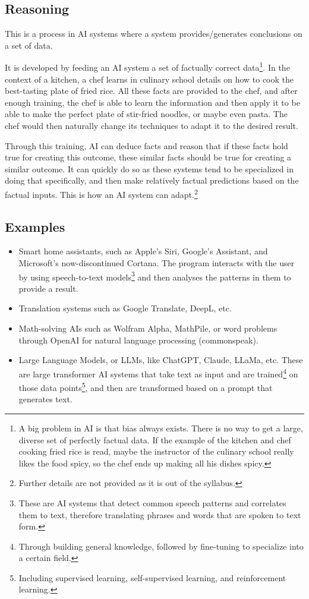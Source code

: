 \documentclass[../main.tex]{subfiles}
\begin{document}
\subsection{Reasoning}

This is a process in AI systems where a system provides/generates conclusions on a set of data.

It is developed by feeding an AI system a set of factually correct data\footnote{A big problem in AI is that bias always exists. There is no way to get a large, diverse set of perfectly factual data. If the example of the kitchen and chef cooking fried rice is read, maybe the instructor of the culinary school really likes the food spicy, so the chef ends up making all his dishes spicy.}. In the context of a kitchen, a chef learns in culinary school details on how to cook the best-tasting plate of fried rice. All these facts are provided to the chef, and after enough training, the chef is able to learn the information and then apply it to be able to make the perfect plate of stir-fried noodles, or maybe even pasta. The chef would then naturally change its techniques to adapt it to the desired result.

Through this training, AI can deduce facts and reason that if these facts hold true for creating this outcome, these similar facts should be true for creating a similar outcome. It can quickly do so as these systems tend to be specialized in doing that specifically, and then make relatively factual predictions based on the factual inputs. This is how an AI system can adapt.\footnote{Further details are not provided as it is out of the syllabus.}

\subsection{Examples}

\begin{itemize}
    \item Smart home assistants, such as Apple’s Siri, Google’s Assistant, and Microsoft’s now-discontinued Cortana. The program interacts with the user by using speech-to-text models\footnote{These are AI systems that detect common speech patterns and correlates them to text, therefore translating phrases and words that are spoken to text form.} and then analyses the patterns in them to provide a result.
    \item Translation systems such as Google Translate, DeepL, etc.
    \item Math-solving AIs such as Wolfram Alpha, MathPile, or word problems through OpenAI for natural language processing (commonspeak).
    \item Large Language Models, or LLMs, like ChatGPT, Claude, LLaMa, etc. These are large transformer AI systems that take text as input and are trained\footnote{Through building general knowledge, followed by fine-tuning to specialize into a certain field.} on those data points\footnote{Including supervised learning, self-supervised learning, and reinforcement learning.}, and then are transformed based on a prompt that generates text.
\end{itemize}
\end{document}
